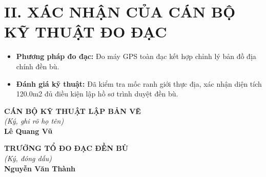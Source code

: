 \documentclass[12pt,a4paper]{article}
\begin{document}
\section*{II. XÁC NHẬN CỦA CÁN BỘ KỸ THUẬT ĐO ĐẠC}
\begin{itemize}[leftmargin=1.5cm]
    \item \textbf{Phương pháp đo đạc:} Đo máy GPS toàn đạc kết hợp chỉnh lý bản đồ địa chính đền bù.
    \item \textbf{Đánh giá kỹ thuật:} Đã kiểm tra mốc ranh giới thực địa, xác nhận diện tích 120.0m2 đủ điều kiện lập hồ sơ trình duyệt đền bù.
\end{itemize}

\vspace{0.8cm}

\noindent
\begin{minipage}[t]{0.45\textwidth}
    \begin{center}
        \small
        \textbf{CÁN BỘ KỸ THUẬT LẬP BẢN VẼ}\\
        \textit{(Ký, ghi rõ họ tên)}\\[1.5cm]
        \textbf{Lê Quang Vũ}
    \end{center}
\end{minipage}
\hfill
\begin{minipage}[t]{0.5\textwidth}
    \begin{center}
        \small
        \textbf{TRƯỞNG TỔ ĐO ĐẠC ĐỀN BÙ}\\
        \textit{(Ký, đóng dấu)}\\[1.5cm]
        \textbf{Nguyễn Văn Thành}
    \end{center}
\end{minipage}
\end{document}
